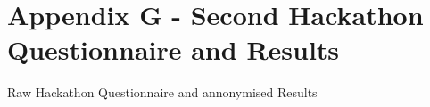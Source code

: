\cleardoublepage%
\chapter*{\label{chap:apx_f}Appendix G - Second Hackathon Questionnaire and Results}%
%

Raw Hackathon Questionnaire and annonymised Results